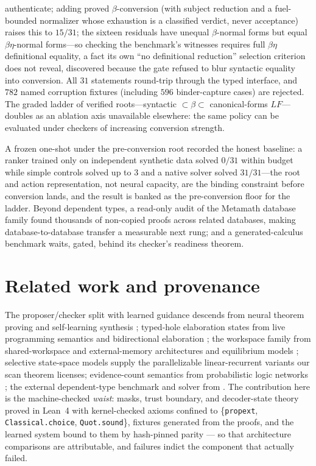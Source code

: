 \documentclass[11pt]{article}
\newcommand{\code}[1]{\texttt{#1}}
\begin{document}
authenticate; adding proved $\beta$-conversion (with subject reduction and a
fuel-bounded normalizer whose exhaustion is a classified verdict, never acceptance)
raises this to $15/31$; the sixteen residuals have unequal $\beta$-normal forms but
equal $\beta\eta$-normal forms---so checking the benchmark's witnesses requires full
$\beta\eta$ definitional equality, a fact its own ``no definitional reduction''
selection criterion does not reveal, discovered because the gate refused to blur
syntactic equality into conversion. All $31$ statements round-trip through the typed
interface, and $782$ named corruption fixtures (including $596$ binder-capture cases)
are rejected. The graded ladder of verified roots---syntactic $\subset\beta\subset$
canonical-forms $LF$---doubles as an ablation axis unavailable elsewhere: the same
policy can be evaluated under checkers of increasing conversion strength.

A frozen one-shot under the pre-conversion root recorded the honest baseline: a ranker
trained only on independent synthetic data solved $0/31$ within budget while simple
controls solved up to $3$ and a native solver \cite{norman2026} solved $31/31$---the
root and action representation, not neural capacity, are the binding constraint before
conversion lands, and the result is banked as the pre-conversion floor for the ladder.
Beyond dependent types, a read-only audit of the Metamath database family found
thousands of non-copied proofs across related databases, making database-to-database
transfer a measurable next rung; and a generated-calculus benchmark waits, gated,
behind its checker's readiness theorem.

\section{Related work and provenance}
\label{sec:related}

The proposer/checker split with learned guidance descends from neural theorem proving
and self-learning synthesis \cite{gauthier2023}; typed-hole elaboration states from
live programming semantics \cite{omar2017} and bidirectional elaboration
\cite{demoura2015}; the workspace family from shared-workspace and external-memory
architectures \cite{goyal2021} and equilibrium models \cite{bai2019deq}; selective
state-space models \cite{gu2023mamba} supply the parallelizable linear-recurrent
variants our scan theorem licenses; evidence-count semantics from probabilistic logic
networks \cite{pln2009}; the external dependent-type benchmark and solver from
\cite{norman2026}. The contribution here is the machine-checked \emph{waist}: masks,
trust boundary, and decoder-state theory proved in Lean~4 with kernel-checked axioms
confined to \{\code{propext}, \code{Classical.choice}, \code{Quot.sound}\}, fixtures
generated from the proofs, and the learned system bound to them by hash-pinned parity
--- so that architecture comparisons are attributable, and failures indict the
component that actually failed.
\end{document}
